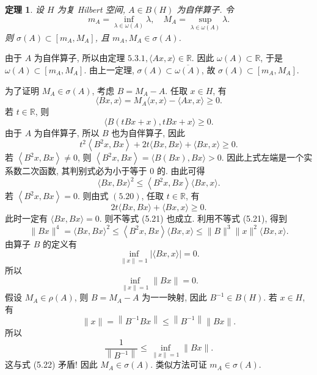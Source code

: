 \documentclass[openany]{ctexbook}
\makeatletter
\theoremstyle{kaiti}
\newtheorem{theorem}{定理}[section]
\theoremstyle{normal}
\renewenvironment{proof}[1][\proofname]{\par
    \pushQED{\qed}%
    \normalfont \topsep6\p@\@plus6\p@\relax
    \trivlist
    \item\relax
    {\heiti #1}\hspace{2\labelsep}\ignorespaces
  }{%
    \popQED\endtrivlist\@endpefalse
  }
\makeatother
\begin{document}
\begin{theorem}
设 $H$ 为复 Hilbert 空间, $A \in B(H)$ 为自伴算子. 令
$$
m_{A}=\inf_{\lambda \in \omega(A)} \lambda, \quad M_{A}=\sup_{\lambda \in \omega(A)} \lambda.
$$
则 $\sigma(A) \subset\left[m_{A}, M_{A}\right]$, 且 $m_{A}, M_{A} \in \sigma(A)$.
\end{theorem}

\begin{proof}
由于 $A$ 为自伴算子, 所以由定理 $5.3.1,\langle A x, x\rangle \in \mathbb{R}$. 因此 $\omega(A) \subset \mathbb{R}$, 于是 $\omega(A) \subset\left[m_{A}, M_{A}\right]$. 由上一定理, $\sigma(A) \subset \overline{\omega(A)}$, 故 $\sigma(A) \subset\left[m_{A}, M_{A}\right]$.

为了证明 $M_{A} \in \sigma(A)$, 考虑 $B=M_{A}-A$. 任取 $x \in H$, 有
$$
\langle B x, x\rangle=M_{A}\langle x, x\rangle-\langle A x, x\rangle \geqslant 0.
$$
若 $t \in \mathbb{R}$, 则
$$
\langle B(t B x+x), t B x+x\rangle \geqslant 0.
$$
由于 $A$ 为自伴算子, 所以 $B$ 也为自伴算子, 因此
\begin{equation}
  t^2\left\langle B^2 x, B x\right\rangle+2 t\langle B x, B x\rangle+\langle B x, x\rangle \geqslant 0.
\end{equation}
若 $\left\langle B^2 x, B x\right\rangle \neq 0$, 则 $\left\langle B^2 x, B x\right\rangle=\langle B(B x), B x\rangle>0$. 因此上式左端是一个实系数二次函数, 其判别式必为小于等于 0 的. 由此可得
\begin{equation}
  \langle B x, B x\rangle^2 \leqslant\left\langle B^2 x, B x\right\rangle\langle B x, x\rangle.
\end{equation}
若 $\left\langle B^2 x, B x\right\rangle=0$. 则由式 $(5.20)$, 任取 $t \in \mathbb{R}$, 有
$$
2 t\langle B x, B x\rangle+\langle B x, x\rangle \geqslant 0.
$$
此时一定有 $\langle B x, B x\rangle=0$. 则不等式 (5.21) 也成立. 利用不等式 (5.21), 得到
$$
\|B x\|^4=\langle B x, B x\rangle^2 \leqslant\left\langle B^2 x, B x\right\rangle\langle B x, x\rangle \leqslant\|B\|^3\|x\|^2\langle B x, x\rangle.
$$
由算子 $B$ 的定义有
$$
\inf_{\|x\|=1}|\langle B x, x\rangle|=0.
$$
所以
\begin{equation}
  \inf_{\|x\|=1}\|B x\|=0.
\end{equation}
假设 $M_{A} \in \rho(A)$, 则 $B=M_{A}-A$ 为一一映射, 因此 $B^{-1} \in B(H)$. 若 $x \in H$, 有
$$
\|x\|=\left\|B^{-1} B x\right\| \leqslant\left\|B^{-1}\right\|\|B x\|.
$$
所以
$$
\frac{1}{\left\|B^{-1}\right\|} \leqslant \inf_{\|x\|=1}\|B x\|.
$$
这与式 (5.22) 矛盾! 因此 $M_{A} \in \sigma(A)$. 类似方法可证 $m_{A} \in \sigma(A)$.
\end{proof}
\end{document}
